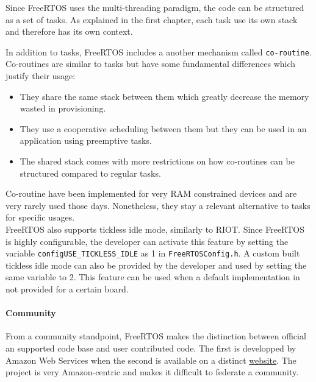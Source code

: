 Since FreeRTOS uses the multi-threading paradigm, the code can be structured as a set of tasks.
As explained in the first chapter, each task use its own stack and therefore has its own context.

In addition to tasks, FreeRTOS includes a another mechanism called \texttt{co-routine}\cite{freertos-tasks-coroutines}\cite{freertos-tasks-coroutines2}.
Co-routines are similar to tasks but have some fundamental differences which justify their usage:
\begin{itemize}
    \item They share the same stack between them which greatly decrease the memory wasted in provisioning.
    \item They use a cooperative scheduling between them but they can be used in an application using preemptive tasks.
    \item The shared stack comes with more restrictions on how co-routines can be structured compared to regular tasks.
\end{itemize}
Co-routine have been implemented for very RAM constrained devices and are very rarely used those days.
Nonetheless, they stay a relevant alternative to tasks for specific usages.\\
FreeRTOS also supports tickless idle mode, similarly to RIOT.
Since FreeRTOS is highly configurable, the developer can activate this feature 
    by setting the variable \texttt{configUSE\_TICKLESS\_IDLE} as 1 in \texttt{FreeRTOSConfig.h}.
A custom built tickless idle mode can also be provided by the developer and used by setting the same variable to 2.
This feature can be used when a default implementation in not provided for a certain board.

\paragraph{Community} From a community standpoint, FreeRTOS makes the distinction between official an supported code base and user contributed code.
The first is developped by Amazon Web Services when the second is available on a distinct \href{https://interactive.freertos.org/hc/en-us}{website}.%
The project is very Amazon-centric and makes it difficult to federate a community.
